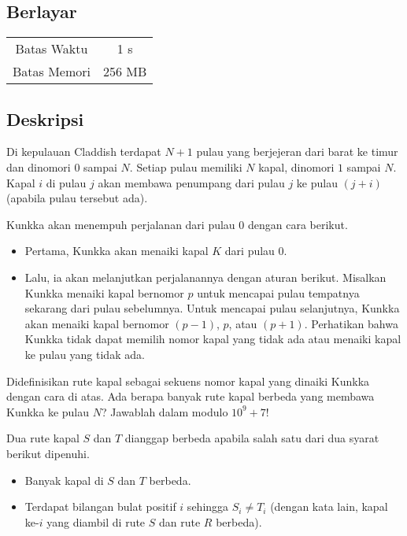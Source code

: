 \documentclass{article}
\begin{document}
\begin{center}
    \section*{Berlayar} %

    \begin{tabular}{ | c c | }
        \hline
        Batas Waktu  & 1 s \\    %
        Batas Memori & 256 MB \\  %
        \hline
    \end{tabular}
\end{center}

\subsection*{Deskripsi}
Di kepulauan Claddish terdapat $N+1$ pulau yang berjejeran dari barat ke timur dan dinomori $0$ sampai $N$. Setiap pulau memiliki $N$ kapal, dinomori $1$ sampai $N$. Kapal $i$ di pulau $j$ akan membawa penumpang dari pulau $j$ ke pulau $(j+i)$ (apabila pulau tersebut ada).

Kunkka akan menempuh perjalanan dari pulau $0$ dengan cara berikut.

\begin{itemize}
    \item Pertama, Kunkka akan menaiki kapal $K$ dari pulau $0$.
    \item Lalu, ia akan melanjutkan perjalanannya dengan aturan berikut. Misalkan Kunkka menaiki kapal bernomor $p$ untuk mencapai pulau tempatnya sekarang dari pulau sebelumnya. Untuk mencapai pulau selanjutnya, Kunkka akan menaiki kapal bernomor $(p-1)$, $p$, atau $(p+1)$. Perhatikan bahwa Kunkka tidak dapat memilih nomor kapal yang tidak ada atau menaiki kapal ke pulau yang tidak ada.
\end{itemize}

Didefinisikan rute kapal sebagai sekuens nomor kapal yang dinaiki Kunkka dengan cara di atas. Ada berapa banyak rute kapal berbeda yang membawa Kunkka ke pulau $N$? Jawablah dalam modulo $10^9+7$!

Dua rute kapal $S$ dan $T$ dianggap berbeda apabila salah satu dari dua syarat berikut dipenuhi.

\begin{itemize}
    \item Banyak kapal di $S$ dan $T$ berbeda.
    \item Terdapat bilangan bulat positif $i$ sehingga $S_i \neq T_i$ (dengan kata lain, kapal ke-$i$ yang diambil di rute $S$ dan rute $R$ berbeda).
\end{itemize}
\end{document}
